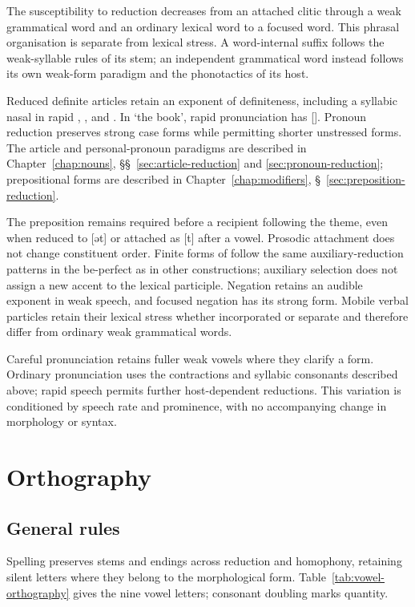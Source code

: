 The susceptibility to reduction decreases from an attached clitic through a weak grammatical word and an ordinary lexical word to a focused word. This phrasal organisation is separate from lexical stress. A word-internal suffix follows the weak-syllable rules of its stem; an independent grammatical word instead follows its own weak-form paradigm and the phonotactics of its host.

Reduced definite articles retain an exponent of definiteness, including a syllabic nasal in rapid , , and . In  `the book', rapid pronunciation has []. Pronoun reduction preserves strong case forms while permitting shorter unstressed forms. The article and personal-pronoun paradigms are described in Chapter~\ref{chap:nouns}, \S\S~\ref{sec:article-reduction} and \ref{sec:pronoun-reduction}; prepositional forms are described in Chapter~\ref{chap:modifiers}, \S~\ref{sec:preposition-reduction}.

The preposition  remains required before a recipient following the theme, even when reduced to [ət] or attached as [t] after a vowel. Prosodic attachment does not change constituent order. Finite forms of  follow the same auxiliary-reduction patterns in the be-perfect as in other constructions; auxiliary selection does not assign a new accent to the lexical participle. Negation  retains an audible exponent in weak speech, and focused negation has its strong form. Mobile verbal particles retain their lexical stress whether incorporated or separate and therefore differ from ordinary weak grammatical words.

Careful pronunciation retains fuller weak vowels where they clarify a form. Ordinary pronunciation uses the contractions and syllabic consonants described above; rapid speech permits further host-dependent reductions. This variation is conditioned by speech rate and prominence, with no accompanying change in morphology or syntax.

\FloatBarrier
\section{Orthography}
\label{sec:orthography}

\subsection{General rules}

Spelling preserves stems and endings across reduction and homophony, retaining silent letters where they belong to the morphological form. Table~\ref{tab:vowel-orthography} gives the nine vowel letters; consonant doubling marks quantity.

